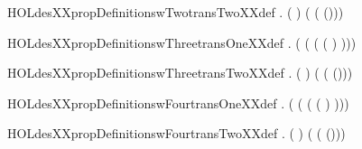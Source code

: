 \newcommand{\HOLdesXXpropDefinitionswTwotransOneXXdef}{\UseVerbatim{HOLdesXXpropDefinitionswTwotransOneXXdef}}
\begin{SaveVerbatim}{HOLdesXXpropDefinitionswTwotransTwoXXdef}
\HOLTokenTurnstile{} \HOLSymConst{\HOLTokenForall{}}.   \HOLSymConst{=}   (  ) ( ( (\HOLSymConst{,})))
\end{SaveVerbatim}
\newcommand{\HOLdesXXpropDefinitionswTwotransTwoXXdef}{\UseVerbatim{HOLdesXXpropDefinitionswTwotransTwoXXdef}}
\begin{SaveVerbatim}{HOLdesXXpropDefinitionswThreetransOneXXdef}
\HOLTokenTurnstile{} \HOLSymConst{\HOLTokenForall{}}.   \HOLSymConst{=}  ( ( (  (  ) )))
\end{SaveVerbatim}
\newcommand{\HOLdesXXpropDefinitionswThreetransOneXXdef}{\UseVerbatim{HOLdesXXpropDefinitionswThreetransOneXXdef}}
\begin{SaveVerbatim}{HOLdesXXpropDefinitionswThreetransTwoXXdef}
\HOLTokenTurnstile{} \HOLSymConst{\HOLTokenForall{}}.   \HOLSymConst{=}   (  ) ( ( (\HOLSymConst{,})))
\end{SaveVerbatim}
\newcommand{\HOLdesXXpropDefinitionswThreetransTwoXXdef}{\UseVerbatim{HOLdesXXpropDefinitionswThreetransTwoXXdef}}
\begin{SaveVerbatim}{HOLdesXXpropDefinitionswFourtransOneXXdef}
\HOLTokenTurnstile{} \HOLSymConst{\HOLTokenForall{}}.   \HOLSymConst{=}  ( ( (  (  ) )))
\end{SaveVerbatim}
\newcommand{\HOLdesXXpropDefinitionswFourtransOneXXdef}{\UseVerbatim{HOLdesXXpropDefinitionswFourtransOneXXdef}}
\begin{SaveVerbatim}{HOLdesXXpropDefinitionswFourtransTwoXXdef}
\HOLTokenTurnstile{} \HOLSymConst{\HOLTokenForall{}}.   \HOLSymConst{=}   (  ) ( ( (\HOLSymConst{,})))
\end{SaveVerbatim}
